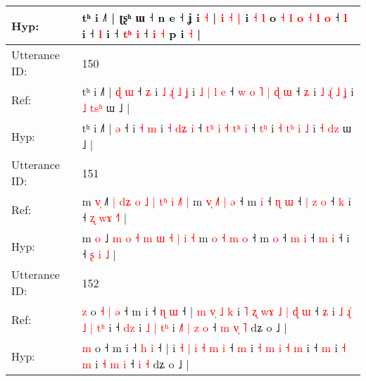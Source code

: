\documentclass[10pt]{article}
\DeclareRobustCommand{\hl}[1]{{\textcolor{red}{#1}}}
\begin{document}
\begin{longtable}{ll}
 \\
Hyp: & tʰ i ˩˥ | ʈʂʰ ɯ ˧ n e ˧ ʝ i\hl{}\hl{}\hl{}\hl{}\hl{}\hl{}\hl{}\hl{}\hl{}\hl{}\hl{}\hl{}\hl{}\hl{}\hl{}\hl{}\hl{}\hl{}\hl{}\hl{} \hl{˧} |\hl{}\hl{} \hl{i} \hl{˧} \hl{|} i \hl{˧} \hl{}\hl{l} o\hl{}\hl{}\hl{}\hl{} \hl{}\hl{˧} \hl{l} \hl{}\hl{o} \hl{˧} \hl{}\hl{}\hl{l} \hl{o} ˧ \hl{l} i ˧ \hl{l} i ˧\hl{} \hl{}\hl{t}\hl{ʰ} \hl{i} ˧\hl{}\hl{} \hl{}\hl{i} \hl{˧} p i \hl{˧} |
 \\
\midrule
Utterance ID: & 150 \\
Ref: & tʰ i ˩˥ |\hl{ }\hl{ɖ} \hl{ɯ} ˧\hl{ }\hl{ʑ} i\hl{ }\hl{˩}\hl{ }\hl{ɻ}\hl{̍} \hl{˩} \hl{ʝ} i \hl{˩} \hl{|}\hl{ }\hl{l} \hl{e} ˧ \hl{}\hl{w} \hl{o} \hl{˥} \hl{|}\hl{ }\hl{ɖ} \hl{ɯ} ˧ \hl{}\hl{ʑ} i \hl{˩} \hl{ɻ}\hl{̍} \hl{˩} \hl{ʝ} i \hl{˩} \hl{t}\hl{s}\hl{ʰ} ɯ ˩ |
 \\
Hyp: & tʰ i ˩˥ |\hl{}\hl{} \hl{ə} ˧\hl{}\hl{} i\hl{}\hl{}\hl{}\hl{}\hl{} \hl{˧} \hl{m} i \hl{˧} \hl{}\hl{d}\hl{ʑ} \hl{i} ˧ \hl{t}\hl{ʰ} \hl{i} \hl{˧} \hl{}\hl{t}\hl{ʰ} \hl{i} ˧ \hl{t}\hl{ʰ} i \hl{˧} \hl{t}\hl{ʰ} \hl{i} \hl{˩} i \hl{˧} \hl{}\hl{d}\hl{z} ɯ ˩ |
 \\
\midrule
Utterance ID: & 151 \\
Ref: & m \hl{v}\hl{̩} ˩\hl{˥} \hl{|} \hl{d}\hl{ʑ} \hl{o} \hl{˩} \hl{|} \hl{t}\hl{ʰ} \hl{i} \hl{˩}\hl{˥} \hl{|} m \hl{v}\hl{̩} \hl{˩}\hl{˥} \hl{|} \hl{ə} ˧ m \hl{i} ˧ \hl{ɳ} \hl{ɯ} ˧\hl{ }\hl{|} \hl{z} \hl{o} ˧\hl{ }\hl{k} i ˧ \hl{ʐ} \hl{w}\hl{ɤ} \hl{˧}\hl{˥} |
 \\
Hyp: & m \hl{}\hl{o} ˩\hl{} \hl{m} \hl{}\hl{o} \hl{˧} \hl{m} \hl{ɯ} \hl{}\hl{˧} \hl{|} \hl{}\hl{i} \hl{˧} m \hl{}\hl{o} \hl{}\hl{˧} \hl{m} \hl{o} ˧ m \hl{o} ˧ \hl{m} \hl{i} ˧\hl{}\hl{} \hl{m} \hl{i} ˧\hl{}\hl{} i ˧ \hl{ʂ} \hl{}\hl{i} \hl{}\hl{˩} |
 \\
\midrule
Utterance ID: & 152 \\
Ref: & \hl{z} o\hl{ }\hl{˧}\hl{ }\hl{|}\hl{ }\hl{ə} ˧ m i ˧ \hl{ɳ} \hl{ɯ} ˧ |\hl{ }\hl{m}\hl{ }\hl{v}\hl{̩}\hl{ }\hl{˩}\hl{ }\hl{k} i\hl{ }\hl{˥} \hl{ʐ} \hl{w}\hl{ɤ} \hl{˩} \hl{|} \hl{ɖ} \hl{ɯ} ˧ \hl{ʑ} i \hl{˩} \hl{ɻ}\hl{̍} \hl{˩} \hl{|} \hl{t}\hl{ʰ} i ˧ \hl{d}\hl{z} i\hl{ }\hl{˩} \hl{|} \hl{t}\hl{ʰ} i\hl{ }\hl{˩}\hl{˥} \hl{|} \hl{z} \hl{o} ˧\hl{ }\hl{m} \hl{v}\hl{̩} \hl{˥} dʑ o ˩ |
 \\
Hyp: & \hl{m} o\hl{}\hl{}\hl{}\hl{}\hl{}\hl{} ˧ m i ˧ \hl{h} \hl{i} ˧ |\hl{}\hl{}\hl{}\hl{}\hl{}\hl{}\hl{}\hl{}\hl{} i\hl{}\hl{} \hl{˧} \hl{}\hl{|} \hl{i} \hl{˧} \hl{m} \hl{i} ˧ \hl{m} i \hl{˧} \hl{}\hl{m} \hl{i} \hl{˧} \hl{}\hl{m} i ˧ \hl{}\hl{m} i\hl{}\hl{} \hl{˧} \hl{}\hl{m} i\hl{}\hl{}\hl{} \hl{˧} \hl{m} \hl{i} ˧\hl{}\hl{} \hl{}\hl{i} \hl{˧} dʑ o ˩ |

\end{longtable}
\end{document}
